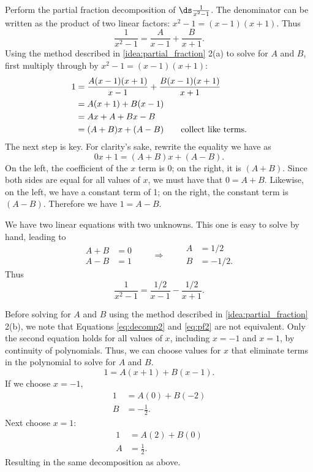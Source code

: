 \begin{example}\label{ex_pf2}
Perform the partial fraction decomposition of $\ds \frac{1}{x^2-1}$.
\solution
The denominator can be written as the product of two linear factors: $x^2-1 = (x-1)(x+1)$. Thus 
\begin{equation}\label{eq:decomp2}
 \frac{1}{x^2-1} = \frac{A}{x-1} + \frac{B}{x+1}.
\end{equation}
Using the method described in \autoref{idea:partial_fraction} 2(a) to solve for $A$ and $B$, first multiply through by $x^2-1 = (x-1)(x+1)$:
\begin{align}\label{eq:pf2}
	1
	&= \frac{A(x-1)(x+1)}{x-1}+\frac{B(x-1)(x+1)}{x+1} \notag\\
	&= A(x+1) + B(x-1)\\
	&= Ax+A + Bx-B \notag\\
	&= (A+B)x + (A-B)\qquad\text{collect like terms.}\notag
\end{align}
The next step is key. %
For clarity's sake, rewrite the equality we have as
\[0x+1 = (A+B)x+(A-B).\]
On the left, the coefficient of the $x$ term is 0; on the right, it is $(A+B)$. Since both sides are equal for all values of $x$, we must have that $0=A+B$. Likewise, on the left, we have a constant term of 1; on the right, the constant term is $(A-B)$. Therefore we have $1=A-B$.

We have two linear equations with two unknowns. This one is easy to solve by hand, leading to 
\[
 \begin{aligned}A+B&=0\\A-B&=1\end{aligned}
 \qquad\Rightarrow\qquad
 \begin{aligned}A&=1/2\\B&=-1/2.\end{aligned}
\]
Thus
\[\frac{1}{x^2-1}=\frac{1/2}{x-1}-\frac{1/2}{x+1}.\]

Before solving for $A$ and $B$ using the method described in \autoref{idea:partial_fraction} 2(b), we note that Equations \eqref{eq:decomp2} and \eqref{eq:pf2} are not equivalent. Only the second equation holds for all values of $x$, including $x=-1$ and $x=1$, by continuity of polynomials. Thus, we can choose values for $x$ that eliminate terms in the polynomial to solve for $A$ and $B$.
\[1=A(x+1) + B(x-1).\]
If we choose $x=-1$,
\begin{align*}
 1&=A(0) + B(-2) \\
 B&=-\frac{1}{2}.
\end{align*}
Next choose $x=1$:
\begin{align*}
 1&=A(2) + B(0) \\
 A&=\frac{1}{2}.
\end{align*}
Resulting in the same decomposition as above.
\end{example}

